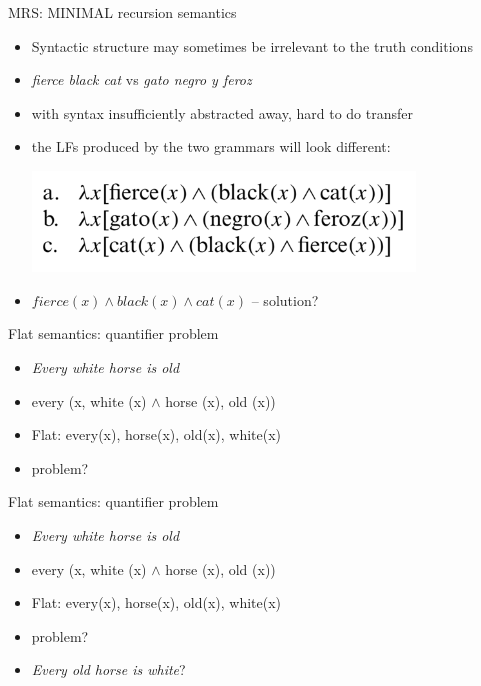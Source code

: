 \documentclass{beamer}
\begin{document}
\begin{frame}{MRS: MINIMAL recursion semantics}
  \begin{itemize}
  \item Syntactic structure may sometimes be irrelevant to the truth conditions
  \item {\it fierce black cat} vs {\it gato negro y feroz}
  \item with syntax insufficiently abstracted away, hard to do transfer
  \item the LFs produced by the two grammars will look different:
    
    \includegraphics[width=0.8\textwidth]{figures/lfs}	
    
  \item $fierce(x) \wedge black(x) \wedge cat(x)$ -- solution?	
  \end{itemize}
\end{frame}

\begin{frame}{Flat semantics: quantifier problem}
  \begin{itemize}
  \item {\it Every white horse is old}
  \item every (x, white (x) $\wedge$ horse (x), old (x))
  \item Flat: every(x), horse(x), old(x), white(x)
  \item problem?
  \end{itemize}
\end{frame}

\begin{frame}{Flat semantics: quantifier problem}
  \begin{itemize}
  \item {\it Every white horse is old}
  \item every (x, white (x) $\wedge$ horse (x), old (x))
  \item Flat: every(x), horse(x), old(x), white(x)
  \item problem?
  \item {\it Every old horse is white}?
  \end{itemize}
\end{frame}
\end{document}
